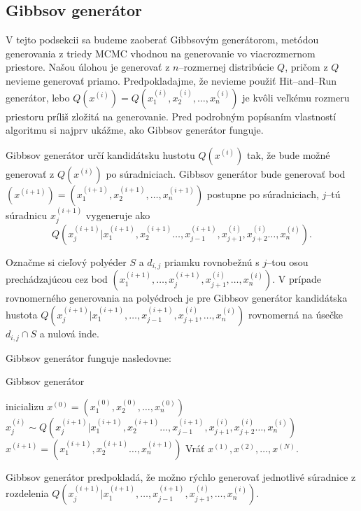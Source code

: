 \subsection{Gibbsov generátor}

V tejto podsekcii sa budeme zaoberať Gibbsovým generátorom, metódou generovania z triedy MCMC vhodnou na generovanie vo viacrozmernom priestore.
Našou úlohou je generovať z $n$--rozmernej distribúcie $Q$, pričom z $Q$ nevieme generovať priamo. Predpokladajme, že nevieme použiť Hit--and--Run generátor, lebo $Q(x^{(i)})=Q(x^{(i)}_1, x^{(i)}_2, \dots, x^{(i)}_n)$ je kvôli veľkému rozmeru priestoru príliš zložitá na generovanie. Pred podrobným popísaním vlastností algoritmu si najprv ukážme, ako Gibbsov generátor funguje.

Gibbsov generátor určí kandidátsku hustotu $Q(x^{(i)})$ tak, že bude možné generovať z $Q(x^{(i)})$ po súradniciach.
Gibbsov generátor bude generovať bod $(x^{(i+1)})=(x^{(i+1)}_1, x^{(i+1)}_2, \dots, x^{(i+1)}_n)$ postupne po súradniciach, $j$--tú súradnicu $x^{(i+1)}_j$ vygeneruje ako $$Q(x^{(i+1)}_j | x^{(i+1)}_1, x^{(i+1)}_2 \dots, x^{(i+1)}_{j-1}, x^{(i)}_{j+1}, x^{(i)}_{j+2} \dots, x^{(i)}_n).$$

Označme si cieľový polyéder $S$ a $d_{i,j}$ priamku rovnobežnú s $j$--tou osou prechádzajúcou cez bod $(x^{(i+1)}_1, \dots, x^{(i+1)}_{j}, x^{(i)}_{j+1}, \dots, x^{(i)}_n)$.
V prípade rovnomerného generovania na polyédroch je pre Gibbsov generátor kandidátska hustota $Q(x^{(i+1)}_j | x^{(i+1)}_1, \dots, x^{(i+1)}_{j-1}, x^{(i)}_{j+1}, \dots, x^{(i)}_n)$ rovnomerná na úsečke $d_{i,j} \cap S$ a nulová inde.

Gibbsov generátor funguje nasledovne:

\begin{algorithm}[H]
	\caption{Gibbsov generátor \cite{mcmc_intro_mackay}}
	\label{gibbs}
	\begin{algorithmic}[1]
		\State inicializu $x^{(0)} = (x^{(0)}_1, x^{(0)}_2, \dots, x^{(0)}_n)$
				\State $x^{(i)}_j \sim Q(x^{(i+1)}_j | x^{(i+1)}_1, x^{(i+1)}_2 \dots, x^{(i+1)}_{j-1}, x^{(i)}_{j+1}, x^{(i)}_{j+2} \dots, x^{(i)}_n)$
			\EndFor
			\State $x^{(i+1)}= (x^{(i+1)}_1, x^{(i+1)}_2 \dots, x^{(i+1)}_n)$
		\EndFor
		\State Vráť ${x^{(1)},x^{(2)},\dots,x^{(N)}}$.
	\end{algorithmic}
\end{algorithm}

Gibbsov generátor predpokladá, že možno rýchlo generovať jednotlivé súradnice z rozdelenia $Q(x^{(i+1)}_j | x^{(i+1)}_1, \dots, x^{(i+1)}_{j-1}, x^{(i)}_{j+1}, \dots, x^{(i)}_n)$.


